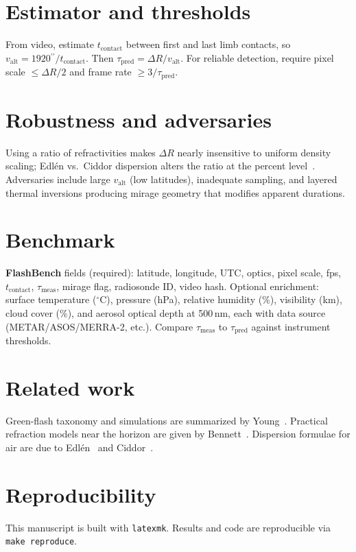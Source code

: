 \documentclass[10pt]{article}
\newcommand{\arcsec}{\ensuremath{^{\prime\prime}}}
\begin{document}
\section{Estimator and thresholds}
From video, estimate $t_{\mathrm{contact}}$ between first and last limb contacts, so $v_{\mathrm{alt}}=1920\arcsec/t_{\mathrm{contact}}$. Then $\tau_{\mathrm{pred}}=\Delta R/v_{\mathrm{alt}}$. For reliable detection, require pixel scale $\le \Delta R/2$ and frame rate $\ge 3/\tau_{\mathrm{pred}}$.

\section{Robustness and adversaries}
Using a ratio of refractivities makes $\Delta R$ nearly insensitive to uniform density scaling; Edl\'en vs.\ Ciddor dispersion alters the ratio at the percent level~\cite{Edlen1966,Ciddor1996}. Adversaries include large $v_{\mathrm{alt}}$ (low latitudes), inadequate sampling, and layered thermal inversions producing mirage geometry that modifies apparent durations.

\section{Benchmark}
\textbf{FlashBench} fields (required): latitude, longitude, UTC, optics, pixel scale, fps, $t_{\mathrm{contact}}$, $\tau_{\mathrm{meas}}$, mirage flag, radiosonde ID, video hash.
Optional enrichment: surface temperature ($^\circ$C), pressure (hPa), relative humidity (\%), visibility (km), cloud cover (\%), and aerosol optical depth at 500\,nm, each with data source (METAR/ASOS/MERRA-2, etc.). Compare $\tau_{\mathrm{meas}}$ to $\tau_{\mathrm{pred}}$ against instrument thresholds.

\section{Related work}
Green-flash taxonomy and simulations are summarized by Young~\cite{YoungJOSA,YoungSim}. Practical refraction models near the horizon are given by Bennett~\cite{Bennett1982}. Dispersion formulae for air are due to Edl\'en~\cite{Edlen1966} and Ciddor~\cite{Ciddor1996}.

\section{Reproducibility}
This manuscript is built with \texttt{latexmk}. Results and code are reproducible via \texttt{make reproduce}.
\end{document}
